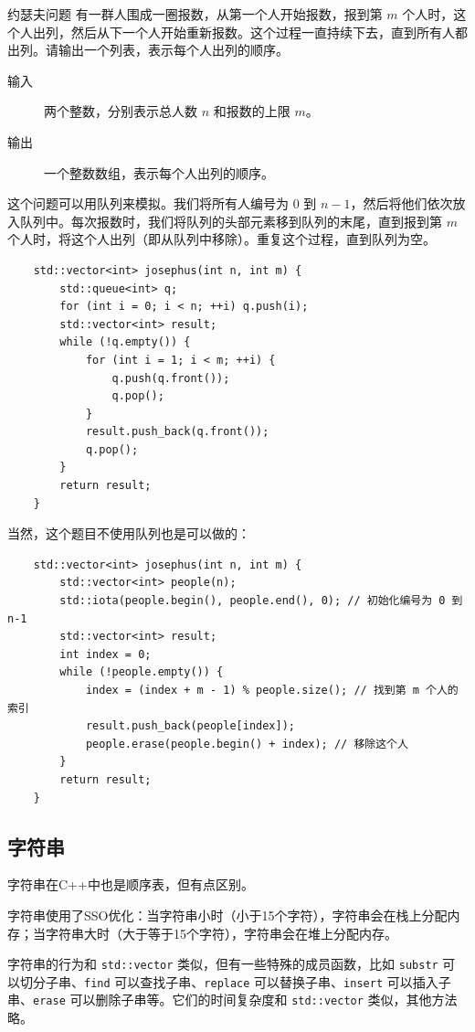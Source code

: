 \begin{example}{约瑟夫问题}{}
    有一群人围成一圈报数，从第一个人开始报数，报到第 $m$ 个人时，这个人出列，然后从下一个人开始重新报数。这个过程一直持续下去，直到所有人都出列。请输出一个列表，表示每个人出列的顺序。
    \begin{description}
        \item[输入] 两个整数，分别表示总人数 $n$ 和报数的上限 $m$。
        \item[输出] 一个整数数组，表示每个人出列的顺序。
    \end{description}
    \tcblower
    这个问题可以用队列来模拟。我们将所有人编号为 $0$ 到 $n-1$，然后将他们依次放入队列中。每次报数时，我们将队列的头部元素移到队列的末尾，直到报到第 $m$ 个人时，将这个人出列（即从队列中移除）。重复这个过程，直到队列为空。
    
    \begin{verbatim}
    std::vector<int> josephus(int n, int m) {
        std::queue<int> q;
        for (int i = 0; i < n; ++i) q.push(i);
        std::vector<int> result;
        while (!q.empty()) {
            for (int i = 1; i < m; ++i) {
                q.push(q.front());
                q.pop();
            }
            result.push_back(q.front());
            q.pop();
        }
        return result;
    }
    \end{verbatim}
    当然，这个题目不使用队列也是可以做的：
    \begin{verbatim}
    std::vector<int> josephus(int n, int m) {
        std::vector<int> people(n);
        std::iota(people.begin(), people.end(), 0); // 初始化编号为 0 到 n-1
        std::vector<int> result;
        int index = 0;
        while (!people.empty()) {
            index = (index + m - 1) % people.size(); // 找到第 m 个人的索引
            result.push_back(people[index]);
            people.erase(people.begin() + index); // 移除这个人
        }
        return result;
    }
    \end{verbatim}
\end{example}

\subsection{字符串}

字符串在C++中也是顺序表，但有点区别。

字符串使用了SSO优化：当字符串小时（小于15个字符），字符串会在栈上分配内存；当字符串大时（大于等于15个字符），字符串会在堆上分配内存。

字符串的行为和 \verb|std::vector| 类似，但有一些特殊的成员函数，比如 \verb|substr| 可以切分子串、\verb|find| 可以查找子串、\verb|replace| 可以替换子串、\verb|insert| 可以插入子串、\verb|erase| 可以删除子串等。它们的时间复杂度和 \verb|std::vector| 类似，其他方法略。

